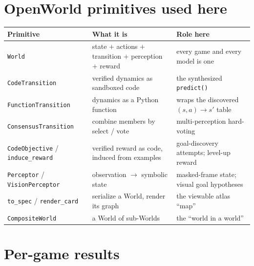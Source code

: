 \documentclass[11pt]{article}
\begin{document}
\section{OpenWorld primitives used here}
\label{app:glossary}
\begin{center}\small
\begin{tabular}{@{}L{3.1cm}L{5.6cm}L{5.6cm}@{}}
\toprule
Primitive & What it is & Role here \\
\midrule
\texttt{World} & state $+$ actions $+$ transition $+$ perception $+$ reward & every game and every model is one \\
\texttt{CodeTransition} & verified dynamics as sandboxed code & the synthesized \texttt{predict()} \\
\texttt{FunctionTransition} & dynamics as a Python function & wraps the discovered $(s,a)\!\to\!s'$ table \\
\texttt{ConsensusTransition} & combine members by select / vote & multi-perception hard-voting \\
\texttt{CodeObjective} / \texttt{induce\_reward} & verified reward as code, induced from examples & goal-discovery attempts; level-up reward \\
\texttt{Perceptor} / \texttt{VisionPerceptor} & observation $\to$ symbolic state & masked-frame state; visual goal hypotheses \\
\texttt{to\_spec} / \texttt{render\_card} & serialize a World, render its graph & the viewable atlas ``map'' \\
\texttt{CompositeWorld} & a World of sub-Worlds & the ``world in a world'' \\
\bottomrule
\end{tabular}
\end{center}

\section{Per-game results}
\label{app:pergame}

\end{document}
